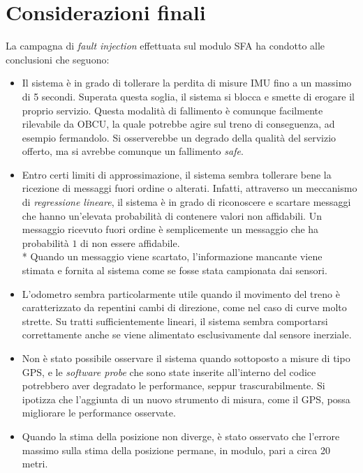 \section{Considerazioni finali}
La campagna di \emph{fault injection} effettuata sul modulo SFA ha condotto alle conclusioni che seguono:
\begin{itemize}
	\item Il sistema \`e in grado di tollerare la perdita di misure IMU fino a un massimo di 5 secondi. Superata questa soglia, il sistema si blocca e smette di erogare il proprio servizio. Questa modalit\`a di fallimento \`e comunque facilmente rilevabile da OBCU, la quale potrebbe agire sul treno di conseguenza, ad esempio fermandolo. Si osserverebbe un degrado della qualit\`a del servizio offerto, ma si avrebbe comunque un fallimento \emph{safe}.
	\item Entro certi limiti di approssimazione, il sistema sembra tollerare bene la ricezione di messaggi fuori ordine o alterati. Infatti, attraverso un meccanismo di \emph{regressione lineare}, il sistema \`e in grado di riconoscere e scartare messaggi che hanno un'elevata probabilit\`a di contenere valori non affidabili. Un messaggio ricevuto fuori ordine \`e semplicemente un messaggio che ha probabilit\`a $1$ di non essere affidabile.\\*
	Quando un messaggio viene scartato, l'informazione mancante viene stimata e fornita al sistema come se fosse stata campionata dai sensori.
	\item L'odometro sembra particolarmente utile quando il movimento del treno \`e caratterizzato da repentini cambi di direzione, come nel caso di curve molto strette. Su tratti sufficientemente lineari, il sistema sembra comportarsi correttamente anche se viene alimentato esclusivamente dal sensore inerziale.
	\item Non \`e stato possibile osservare il sistema quando sottoposto a misure di tipo GPS, e le \emph{software probe} che sono state inserite all'interno del codice potrebbero aver degradato le performance, seppur trascurabilmente. Si ipotizza che l'aggiunta di un nuovo strumento di misura, come il GPS, possa migliorare le performance osservate.
	\item Quando la stima della posizione non diverge, \`e stato osservato che l'errore massimo sulla stima della posizione permane, in modulo, pari a circa 20 metri.
\end{itemize}